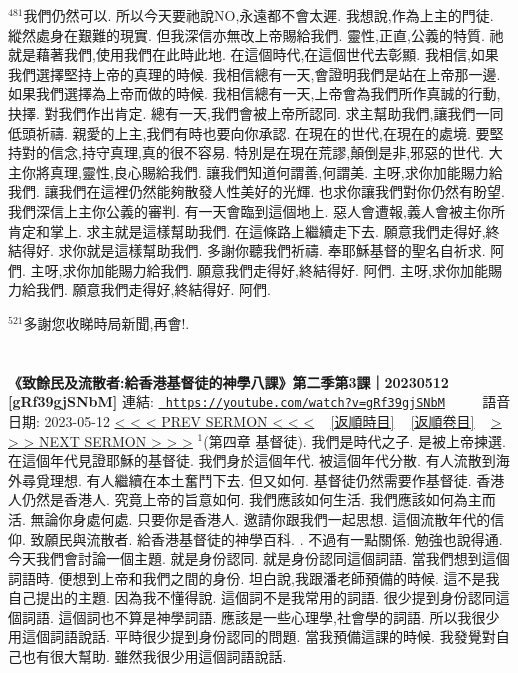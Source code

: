 \documentclass{book}
\begin{document}
$^{481}$我們仍然可以.
所以今天要祂說NO,永遠都不會太遲.
我想說,作為上主的門徒.
縱然處身在艱難的現實.
但我深信亦無改上帝賜給我們.
靈性,正直,公義的特質.
祂就是藉著我們,使用我們在此時此地.
在這個時代,在這個世代去彰顯.
我相信,如果我們選擇堅持上帝的真理的時候.
我相信總有一天,會證明我們是站在上帝那一邊.
如果我們選擇為上帝而做的時候.
我相信總有一天,上帝會為我們所作真誠的行動,抉擇.
對我們作出肯定.
總有一天,我們會被上帝所認同.
求主幫助我們,讓我們一同低頭祈禱.
親愛的上主,我們有時也要向你承認.
在現在的世代,在現在的處境.
要堅持對的信念,持守真理,真的很不容易.
特別是在現在荒謬,顛倒是非,邪惡的世代.
大主你將真理,靈性,良心賜給我們.
讓我們知道何謂善,何謂美.
主呀,求你加能賜力給我們.
讓我們在這裡仍然能夠散發人性美好的光輝.
也求你讓我們對你仍然有盼望.
我們深信上主你公義的審判.
有一天會臨到這個地上.
惡人會遭報,義人會被主你所肯定和掌上.
求主就是這樣幫助我們.
在這條路上繼續走下去.
願意我們走得好,終結得好.
求你就是這樣幫助我們.
多謝你聽我們祈禱.
奉耶穌基督的聖名自祈求.
阿們.
主呀,求你加能賜力給我們.
願意我們走得好,終結得好.
阿們.
主呀,求你加能賜力給我們.
願意我們走得好,終結得好.
阿們.

$^{521}$多謝您收睇時局新聞,再會!.
\newpage



\section{}
\label{sec:gRf39gjSNbM}
\textbf{《致餘民及流散者:給香港基督徒的神學八課》第二季第3課｜20230512 [gRf39gjSNbM]}
\newline
\newline
連結: \href{https://youtube.com/watch?v=gRf39gjSNbM}{\texttt{ https://youtube.com/watch?v=gRf39gjSNbM}} ~~~~ 語音日期: 2023-05-12 
\newline
\newline
\hyperref[sec:D8sOzznkhGg]{\small{< < < PREV SERMON < < <}}
~
\hyperref[sec:index_chronic]{\small{[返順時目]}}
~
\hyperref[sec:index_scriptual]{\small{[返順卷目]}}
~
\hyperref[sec:u6GL1Cm7cwU]{\small{> > > NEXT SERMON > > >}}
\newline
\newline
$^{1}$(第四章 基督徒).
我們是時代之子.
是被上帝揀選.
在這個年代見證耶穌的基督徒.
我們身於這個年代.
被這個年代分散.
有人流散到海外尋覓理想.
有人繼續在本土奮鬥下去.
但又如何.
基督徒仍然需要作基督徒.
香港人仍然是香港人.
究竟上帝的旨意如何.
我們應該如何生活.
我們應該如何為主而活.
無論你身處何處.
只要你是香港人.
邀請你跟我們一起思想.
這個流散年代的信仰.
致願民與流散者.
給香港基督徒的神學百科.
.
不過有一點關係.
勉強也說得通.
今天我們會討論一個主題.
就是身份認同.
就是身份認同這個詞語.
當我們想到這個詞語時.
便想到上帝和我們之間的身份.
坦白說,我跟潘老師預備的時候.
這不是我自己提出的主題.
因為我不懂得說.
這個詞不是我常用的詞語.
很少提到身份認同這個詞語.
這個詞也不算是神學詞語.
應該是一些心理學,社會學的詞語.
所以我很少用這個詞語說話.
平時很少提到身份認同的問題.
當我預備這課的時候.
我發覺對自己也有很大幫助.
雖然我很少用這個詞語說話.
\end{document}
